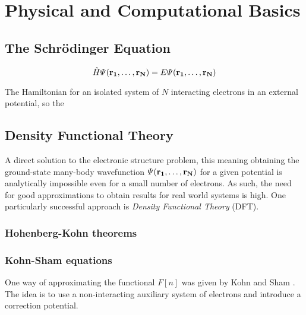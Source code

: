 \documentclass[\main/main.tex]{subfiles}
\begin{document}
\chapter{Physical and Computational Basics\label{chap:theory}}

\section{The Schrödinger Equation\label{sec:theory_schrödinger}}

\begin{equation}
    \hat{H} \Psi (\vb{r_1}, \ldots, \vb{r_N}) = E \Psi (\vb{r_1}, \ldots, \vb{r_N})
\end{equation}

The Hamiltonian for an isolated system of \(N\) interacting electrons in an external potential, so the 

\section{Density Functional Theory\label{sec:theory_dft}}

A direct solution to the electronic structure problem, this meaning obtaining the ground-state many-body wavefunction \(\Psi (\vb{r_1}, \ldots, \vb{r_N})\) for
a given potential is analytically impossible even for a small number of electrons. As such, the need for good approximations to obtain results for real world
systems is high. One particularly successful approach is \emph{Density Functional Theory} (DFT).


\subsection{Hohenberg-Kohn theorems}



\subsection{Kohn-Sham equations}

One way of approximating the functional \(F[n]\) was given by Kohn and Sham \cite{kohn_self-consistent_1965}. The idea is to use a non-interacting
auxiliary system of electrons and introduce a correction potential. 
\end{document}
